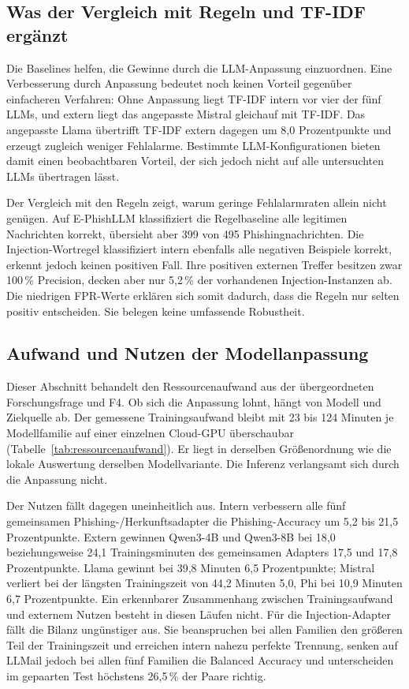\documentclass[12pt,twoside=false,a4paper,parskip]{scrbook}
\begin{document}
\subsection{Was der Vergleich mit Regeln und TF-IDF ergänzt}

Die Baselines helfen, die Gewinne durch die LLM-Anpassung einzuordnen. Eine Verbesserung durch Anpassung bedeutet noch keinen Vorteil gegenüber einfacheren Verfahren: Ohne Anpassung liegt TF-IDF intern vor vier der fünf LLMs, und extern liegt das angepasste Mistral gleichauf mit TF-IDF. Das angepasste Llama übertrifft TF-IDF extern dagegen um 8{,}0 Prozentpunkte und erzeugt zugleich weniger Fehlalarme. Bestimmte LLM-Konfigurationen bieten damit einen beobachtbaren Vorteil, der sich jedoch nicht auf alle untersuchten LLMs übertragen lässt.

Der Vergleich mit den Regeln zeigt, warum geringe Fehlalarmraten allein nicht genügen. Auf E-PhishLLM klassifiziert die Regelbaseline alle legitimen Nachrichten korrekt, übersieht aber 399 von 495 Phishingnachrichten. Die Injection-Wortregel klassifiziert intern ebenfalls alle negativen Beispiele korrekt, erkennt jedoch keinen positiven Fall. Ihre positiven externen Treffer besitzen zwar 100\,\% Precision, decken aber nur 5{,}2\,\% der vorhandenen Injection-Instanzen ab. Die niedrigen FPR-Werte erklären sich somit dadurch, dass die Regeln nur selten positiv entscheiden. Sie belegen keine umfassende Robustheit.

\subsection{Aufwand und Nutzen der Modellanpassung}\label{sec:aufwand-nutzen}

Dieser Abschnitt behandelt den Ressourcenaufwand aus der übergeordneten Forschungsfrage und F4. Ob sich die Anpassung lohnt, hängt von Modell und Zielquelle ab. Der gemessene Trainingsaufwand bleibt mit 23 bis 124 Minuten je Modellfamilie auf einer einzelnen Cloud-GPU überschaubar (Tabelle~\ref{tab:ressourcenaufwand}). Er liegt in derselben Größenordnung wie die lokale Auswertung derselben Modellvariante. Die Inferenz verlangsamt sich durch die Anpassung nicht.

Der Nutzen fällt dagegen uneinheitlich aus. Intern verbessern alle fünf gemeinsamen Phishing-/Herkunftsadapter die Phishing-Accuracy um 5{,}2 bis 21{,}5 Prozentpunkte. Extern gewinnen Qwen3-4B und Qwen3-8B bei 18{,}0 beziehungsweise 24{,}1 Trainingsminuten des gemeinsamen Adapters 17{,}5 und 17{,}8 Prozentpunkte. Llama gewinnt bei 39{,}8 Minuten 6{,}5 Prozentpunkte; Mistral verliert bei der längsten Trainingszeit von 44{,}2 Minuten 5{,}0, Phi bei 10{,}9 Minuten 6{,}7 Prozentpunkte. Ein erkennbarer Zusammenhang zwischen Trainingsaufwand und externem Nutzen besteht in diesen Läufen nicht. Für die Injection-Adapter fällt die Bilanz ungünstiger aus. Sie beanspruchen bei allen Familien den größeren Teil der Trainingszeit und erreichen intern nahezu perfekte Trennung, senken auf LLMail jedoch bei allen fünf Familien die Balanced Accuracy und unterscheiden im gepaarten Test höchstens 26{,}5\,\% der Paare richtig.
\end{document}
